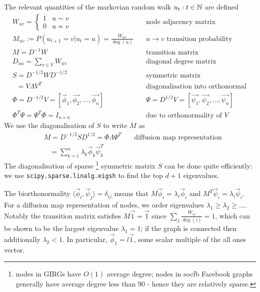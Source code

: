 The relevant quantities of the markovian random walk $u_t : t \in \mathbb{N}$ are defined
\begin{align*}
  & W_{uv} = \begin{cases}1 & u \sim v \\0 & u \nsim v \end{cases} \quad & \text{node adjacency matrix}
  \\
  & M_{uv} := P(u_{t+1} = v | u_t=u) = \frac{W_{uv}}{\deg(u)}
  \quad & \text{$u \to v$ transition probability}
  \\
  & M = D^{-1}W \quad & \text{transition matrix}\\
  & D_{uu} = \sum_{v\in V} W_{uv} \quad & \text{diagonal degree matrix}\\
  & S = D^{-1/2} W D^{-1/2} \quad & \text{symmetric matrix}\\
  & \;\; = V \Lambda V^T \quad & \text{diagonalisation into orthonormal e-vectors}\\
  & \Phi = D^{-1/2} V = [\vec{\phi}_1, \vec{\phi_2}, ..., \vec{\phi_n}] \quad & \Psi = D^{1/2} V = [\vec{\psi_1}, \vec{\psi_2}, ..., \vec{\psi_n}]\\
  & \Phi^T \Psi = \Psi^T \Phi = I_{n \times n} \quad & \text{due to orthonormality of $V$}
\end{align*}
%
We use the diagonalisation of $S$ to write $M$ as 
\begin{align*}
  & M = D^{-1/2} S D^{1/2} = \Phi \Lambda \Psi^T \quad & \text{diffusion map representation}\\
  & \;\;\; = \sum_{k=1}^n \lambda_k \vec{\phi}_k \vec{\psi}_k^T &
\end{align*}
%
The diagonalisation of sparse
\footnote{nodes in GIRGs have $O(1)$ average degree; nodes in socfb Facebook graphs generally have average degree less than $90$ - hence they are relatively sparse.}
symmetric matrix $S$ can be done quite efficiently: 
we use \verb+scipy.sparse.linalg.eigsh+ to find the top $d+1$ eigenvalues.

The biorthonormality $\langle \vec{\phi}_i, \vec{\psi}_j \rangle = \delta_{ij}$ means that $M \vec{\phi}_i = \lambda_i \vec{\phi}_i$ and $M^T \vec{\psi}_i = \lambda_i \vec{\psi}_i$. For a diffusion map representation of nodes, we order eigenvalues $\lambda_1 \geq \lambda_2 \geq ...$.
Notably the transition matrix satisfies $M\vec{1} = \vec{1}$ since $\sum_j \frac{W_{ij}}{\deg(i)} = 1$, which can be shown to be the largest eigenvalue $\lambda_1=1$; if the graph is connected then additionally $\lambda_2 < 1$. In particular, $\vec{\phi}_1 = l \vec{1}$, some scalar multiple of the all ones vector.

